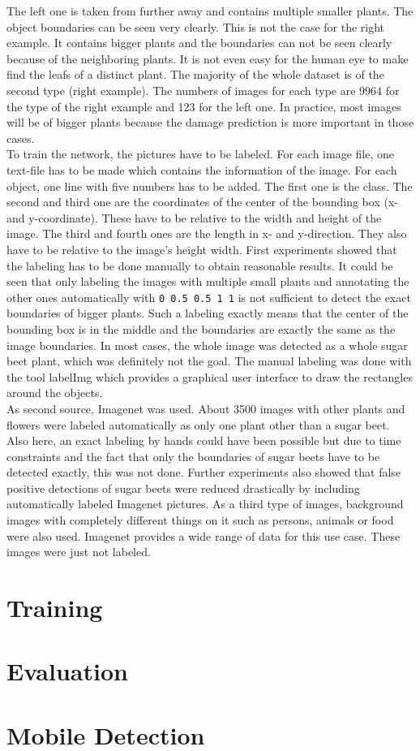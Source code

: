 The left one is taken from further away and contains multiple smaller plants. The object boundaries can be seen very clearly. This is not the case for the right example. It contains bigger plants and the boundaries can not be seen clearly because of the neighboring plants. It is not even easy for the human eye to make find the leafs of a distinct plant. The majority of the whole dataset is of the second type (right example). The numbers of images for each type are 9964 for the type of the right example and 123 for the left one. In practice, most images will be of bigger plants because the damage prediction is more important in those cases.\\

To train the network, the pictures have to be labeled. For each image file, one text-file has to be made which contains the information of the image. For each object, one line with five numbers has to be added. The first one is the class. The second and third one are the coordinates of the center of the bounding box (x- and y-coordinate). These have to be relative to the width and height of the image. The third and fourth ones are the length in x- and y-direction. They also have to be relative to the image's height width. First experiments showed that the labeling has to be done manually to obtain reasonable results. It could be seen that only labeling the images with multiple small plants and annotating the other ones automatically with \texttt{0 0.5 0.5 1 1} is not sufficient to detect the exact boundaries of bigger plants. Such a labeling exactly means that the center of the bounding box is in the middle and the boundaries are exactly the same as the image boundaries. In most cases, the whole image was detected as a whole sugar beet plant, which was definitely not the goal. The manual labeling was done with the tool labelImg \cite{labelimg} which provides a graphical user interface to draw the rectangles around the objects. \\

As second source, Imagenet was used. About 3500 images with other plants and flowers were labeled automatically as only one plant other than a sugar beet. Also here, an exact labeling by hands could have been possible but due to time constraints and the fact that only the boundaries of sugar beets have to be detected exactly, this was not done. Further experiments also showed that false positive detections of sugar beets were reduced drastically by including automatically labeled Imagenet pictures. As a third type of images, background images with completely different things on it such as persons, animals or food were also used. Imagenet provides a wide range of data for this use case. These images were just not labeled. 

\section{Training}

\section{Evaluation}

\section{Mobile Detection}
